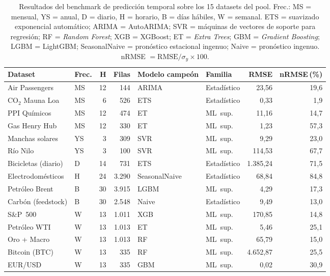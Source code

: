 \documentclass[12pt,a4paper]{article}
\theoremstyle{plain}
\begin{document}
\begin{table}[H]
\centering
\scriptsize
\setlength{\tabcolsep}{4pt}
\renewcommand{\arraystretch}{1.05}
\begin{tabularx}{\linewidth}{>{\RaggedRight\arraybackslash}X l r r >{\RaggedRight\arraybackslash}X l r r}
\hline
\textbf{Dataset} & \textbf{Frec.} & \textbf{H} & \textbf{Filas} & \textbf{Modelo campeón} & \textbf{Familia} & \textbf{RMSE} & \textbf{nRMSE\,(\%)} \\\hline
Air Passengers         & MS & 12 &    144 & ARIMA         & Estadístico &     23,56 & 19,6 \\\hline
CO$_2$ Mauna Loa       & MS &  6 &    526 & ETS           & Estadístico &      0,33 &  1,9 \\\hline
PPI Químicos           & MS & 12 &    474 & ET            & ML~sup.     &     11,16 & 14,7 \\\hline
Gas Henry Hub          & MS & 12 &    330 & ET            & ML~sup.     &      1,23 & 57,3 \\\hline
Manchas solares        & YS &  3 &    309 & SVR           & ML~sup.     &      9,29 & 23,0 \\\hline
Río Nilo               & YS &  3 &    100 & SVR           & ML~sup.     &    114,53 & 67,7 \\\hline
Bicicletas (diario)    &  D & 14 &    731 & ETS           & Estadístico & 1.385,24 & 71,5 \\\hline
Electrodomésticos      &  H & 24 &  3.290 & SeasonalNaive & Estadístico &     68,84 & 84,8 \\\hline
Petróleo Brent         &  B & 30 &  3.915 & LGBM          & ML~sup.     &      4,29 & 17,3 \\\hline
Carbón (feedstock)     &  B & 30 &  2.548 & Naive         & Estadístico &      9,49 & 13,0 \\\hline
S\&P~500               &  W & 13 &  1.011 & XGB           & ML~sup.     &    170,85 & 14,8 \\\hline
Petróleo WTI           &  W & 13 &  1.013 & ET            & ML~sup.     &      5,46 & 25,1 \\\hline
Oro + Macro            &  W & 13 &  1.013 & RF            & ML~sup.     &     65,79 & 15,0 \\\hline
Bitcoin (BTC)          &  W & 13 &    335 & RF            & ML~sup.     &  4.652,87 & 25,5 \\\hline
EUR/USD                &  W & 13 &    335 & GBM           & ML~sup.     &      0,02 & 30,9 \\\hline
\end{tabularx}
\caption{Resultados del benchmark de predicción temporal sobre los 15 datasets del pool. Frec.: MS = mensual, YS = anual, D = diario, H = horario, B = días hábiles, W = semanal. ETS = suavizado exponencial automático; ARIMA = AutoARIMA; SVR = máquinas de vectores de soporte para regresión; RF = \textit{Random Forest}; XGB = XGBoost; ET = \textit{Extra Trees}; GBM = \textit{Gradient Boosting}; LGBM = LightGBM; SeasonalNaive = pronóstico estacional ingenuo; Naive = pronóstico ingenuo. nRMSE $=\text{RMSE}/\sigma_y\times100$.}
\label{tab:pool-forecasting}
\end{table}
\end{document}
